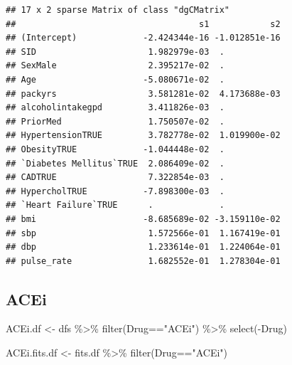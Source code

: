 \documentclass[
]{article}
\newenvironment{Shaded}{\begin{snugshade}}{\end{snugshade}}
\newcommand{\FloatTok}[1]{\textcolor[rgb]{0.00,0.00,0.81}{#1}}
\newcommand{\FunctionTok}[1]{\textcolor[rgb]{0.00,0.00,0.00}{#1}}
\newcommand{\NormalTok}[1]{#1}
\newcommand{\OtherTok}[1]{\textcolor[rgb]{0.56,0.35,0.01}{#1}}
\newcommand{\SpecialCharTok}[1]{\textcolor[rgb]{0.00,0.00,0.00}{#1}}
\newcommand{\StringTok}[1]{\textcolor[rgb]{0.31,0.60,0.02}{#1}}
\begin{document}
\begin{Shaded}
\end{Shaded}

\begin{verbatim}
## 17 x 2 sparse Matrix of class "dgCMatrix"
##                                    s1            s2
## (Intercept)             -2.424344e-16 -1.012851e-16
## SID                      1.982979e-03  .           
## SexMale                  2.395217e-02  .           
## Age                     -5.080671e-02  .           
## packyrs                  3.581281e-02  4.173688e-03
## alcoholintakegpd         3.411826e-03  .           
## PriorMed                 1.750507e-02  .           
## HypertensionTRUE         3.782778e-02  1.019900e-02
## ObesityTRUE             -1.044448e-02  .           
## `Diabetes Mellitus`TRUE  2.086409e-02  .           
## CADTRUE                  7.322854e-03  .           
## HypercholTRUE           -7.898300e-03  .           
## `Heart Failure`TRUE      .             .           
## bmi                     -8.685689e-02 -3.159110e-02
## sbp                      1.572566e-01  1.167419e-01
## dbp                      1.233614e-01  1.224064e-01
## pulse_rate               1.682552e-01  1.278304e-01
\end{verbatim}

\hypertarget{acei}{%
\subsection{ACEi}\label{acei}}

\begin{Shaded}
\begin{Highlighting}[]
\NormalTok{ACEi.df }\OtherTok{\textless{}{-}}\NormalTok{ dfs }\SpecialCharTok{\%\textgreater{}\%} 
  \FunctionTok{filter}\NormalTok{(Drug}\SpecialCharTok{==}\StringTok{"ACEi"}\NormalTok{) }\SpecialCharTok{\%\textgreater{}\%} 
  \FunctionTok{select}\NormalTok{(}\SpecialCharTok{{-}}\NormalTok{Drug)}
\end{Highlighting}
\end{Shaded}

\begin{Shaded}
\begin{Highlighting}[]
\NormalTok{ACEi.fits.df }\OtherTok{\textless{}{-}}\NormalTok{ fits.df }\SpecialCharTok{\%\textgreater{}\%} 
  \FunctionTok{filter}\NormalTok{(Drug}\SpecialCharTok{==}\StringTok{"ACEi"}\NormalTok{)}
\end{Highlighting}
\end{Shaded}
\end{document}
